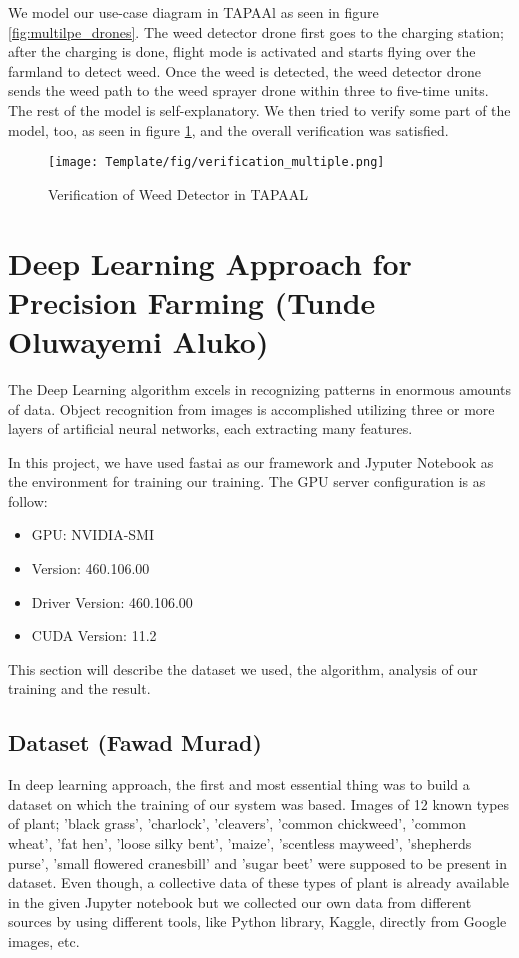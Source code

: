 \documentclass[english]{lni}
\begin{document}
We model our use-case diagram in TAPAAl as seen in figure \ref{fig:multilpe_drones}. The weed detector drone first goes to the charging station; after the charging is done, flight mode is activated and starts flying over the farmland to detect weed. Once the weed is detected, the weed detector drone sends the weed path to the weed sprayer drone within three to five-time units. The rest of the model is self-explanatory. We then tried to verify some part of the model, too, as seen in figure \ref{fig:multiVer}, and the overall verification was satisfied.

\begin{figure}[htp]
    \centering
    \texttt{[image: Template/fig/verification\_multiple.png]}
    \caption{Verification of Weed Detector in TAPAAL}
    \label{fig:multiVer}
\end{figure}
\section{Deep Learning Approach for Precision Farming (Tunde Oluwayemi Aluko)}

The Deep Learning algorithm excels in recognizing patterns in enormous amounts of data. Object recognition from images is accomplished utilizing three or more layers of artificial neural networks, each extracting many features.

In this project, we have used fastai as our framework and Jyputer Notebook as the environment for training our training. The GPU server configuration is as follow:
\begin{itemize}
    \item[] GPU: NVIDIA-SMI 
    \item[] Version: 460.106.00   
    \item[] Driver Version: 460.106.00   
    \item[] CUDA Version: 11.2  
\end{itemize}

This section will describe the dataset we used, the algorithm, analysis of our training and the result.

\subsection{Dataset  (Fawad Murad)}

In deep learning approach, the first and most essential thing was to build a dataset on which the training of our system was based. Images of 12 known types of plant; 'black grass', 'charlock', 'cleavers', 'common chickweed', 'common wheat', 'fat hen', 'loose silky bent', 'maize', 'scentless mayweed', 'shepherds purse', 'small flowered cranesbill' and 'sugar beet' were supposed to be present in dataset. Even though, a collective data of these types of plant is already available in the given Jupyter notebook but we collected our own data from different sources by using different tools, like Python library, Kaggle, directly from Google images, etc. 
\end{document}
